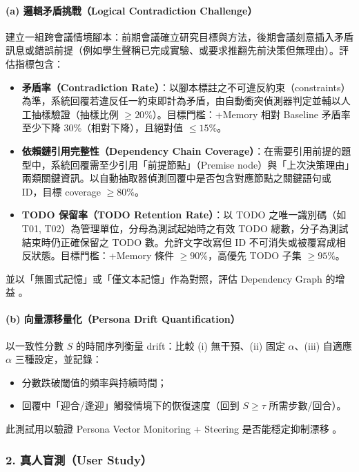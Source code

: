 \paragraph{(a) 邏輯矛盾挑戰（Logical Contradiction Challenge）}
建立一組跨會議情境腳本：前期會議確立研究目標與方法，後期會議刻意插入矛盾訊息或錯誤前提（例如學生聲稱已完成實驗、或要求推翻先前決策但無理由）。評估指標包含：
\begin{itemize}
    \item \textbf{矛盾率（Contradiction Rate）}：以腳本標註之不可違反約束（constraints）為準，系統回覆若違反任一約束即計為矛盾，由自動衝突偵測器判定並輔以人工抽樣驗證（抽樣比例 $\ge 20\%$）。目標門檻：+Memory 相對 Baseline 矛盾率至少下降 30\%（相對下降），且絕對值 $\le 15\%$。
    \item \textbf{依賴鏈引用完整性（Dependency Chain Coverage）}：在需要引用前提的題型中，系統回覆需至少引用「前提節點」（Premise node）與「上次決策理由」兩類關鍵資訊。以自動抽取器偵測回覆中是否包含對應節點之關鍵語句或 ID，目標 coverage $\ge 80\%$。
    \item \textbf{TODO 保留率（TODO Retention Rate）}：以 TODO 之唯一識別碼（如 T01, T02）為管理單位，分母為測試起始時之有效 TODO 總數，分子為測試結束時仍正確保留之 TODO 數。允許文字改寫但 ID 不可消失或被覆寫成相反狀態。目標門檻：+Memory 條件 $\ge 90\%$，高優先 TODO 子集 $\ge 95\%$。
\end{itemize}
並以「無圖式記憶」或「僅文本記憶」作為對照，評估 Dependency Graph 的增益 \citep{a2402_17753v1_locomomemoryeval,a2505_16067v2_memorymanagementimpacts,a2602_05665v1_graphagentmemory}。

\paragraph{(b) 向量漂移量化（Persona Drift Quantification）}
以一致性分數 $S$ 的時間序列衡量 drift：比較 (i) 無干預、(ii) 固定 $\alpha$、(iii) 自適應 $\alpha$ 三種設定，並記錄：
\begin{itemize}
  \item 分數跌破閾值的頻率與持續時間；
  \item 回覆中「迎合/逢迎」觸發情境下的恢復速度（回到 $S \ge \tau$ 所需步數/回合）。
\end{itemize}
此測試用以驗證 Persona Vector Monitoring + Steering 是否能穩定抑制漂移 \citep{a2507_21509v3_personavectors,turner-etal-2023-activation-addition}。

\subsubsection*{2. 真人盲測（User Study）}
